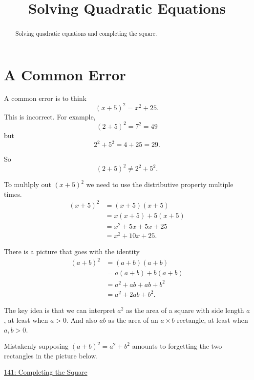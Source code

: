 \documentclass{ximera}
\title{Solving Quadratic Equations}
\begin{document}
\begin{abstract}
Solving quadratic equations and completing the square.
\end{abstract}
\maketitle




\section{A Common Error}

A common error is to think
\[
      (x + 5)^2 = x^2 + 25.
\]
This is incorrect. For example,
\[
    (2 + 5)^2 = 7^2 = 49
\]
but 
\[
 2^2 + 5^2 = 4 + 25 = 29.
\]

So
\[
   (2+5)^2 \neq 2^2 + 5^2 .
\]

To multlply out $(x+5)^2$ we need to use the distributive property multiple times.
\begin{align*}
(x+5)^2 &= (x+5)(x+5) \\
             &= x(x+5) + 5(x+5) \\
             &= x^2 + 5x + 5x + 25 \\
             &= x^2 +10x + 25.
\end{align*}

There is a picture that goes with the identity
\begin{align*}
(a+b)^2 &= (a+b)(a+b) \\
             &= a(a+b) + b(a+b) \\
             &= a^2 + ab + ab + b^2 \\
             &= a^2 +2ab + b^2.
\end{align*}

The key idea is that we can interpret $a^2$ as the area of a square with side length $a$, at least when $a>0$. And also $ab$ as the area of an $a\times b$ rectangle, at least when $a,b>0$.

Mistakenly supposing $(a+b)^2 = a^2 + b^2$ amounts to forgetting the two rectangles in the picture below.

\begin{onlineOnly}
    \begin{center}
\end{center}
\end{onlineOnly}

\href{https://www.desmos.com/calculator/j1ghh5lcse}{141: Completing the Square}
\end{document}
